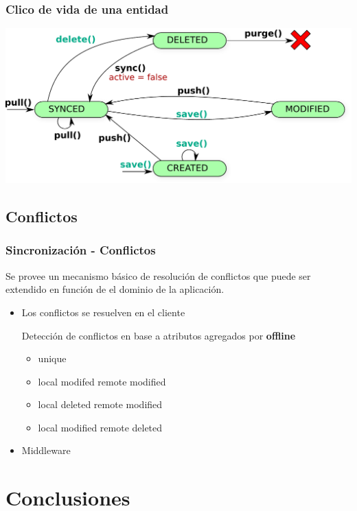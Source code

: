 \documentclass{beamer}
\begin{document}
\begin{frame}
    \frametitle{Clico de vida de una entidad}
    \includegraphics[scale=0.55]{esquema_sync_client.pdf}
\end{frame}

\subsection{Conflictos}
\begin{frame}
    \frametitle{Sincronización - Conflictos}
    \par{
    Se provee un mecanismo básico de resolución de conflictos que 
    puede ser extendido en función de el dominio de la aplicación.
    }
    
    \begin{itemize}
        \item Los conflictos se resuelven en el cliente
        \begin{item} 
        Detección de conflictos en base a atributos agregados por
        {\bf offline}
        \begin{itemize}
          \item unique
          \item local modifed remote modified
          \item local deleted remote modified
          \item local modified remote deleted
        \end{itemize}
        \end{item}
        \item{Middleware}        
    \end{itemize}
\end{frame}

\section{Conclusiones}
\end{document}
